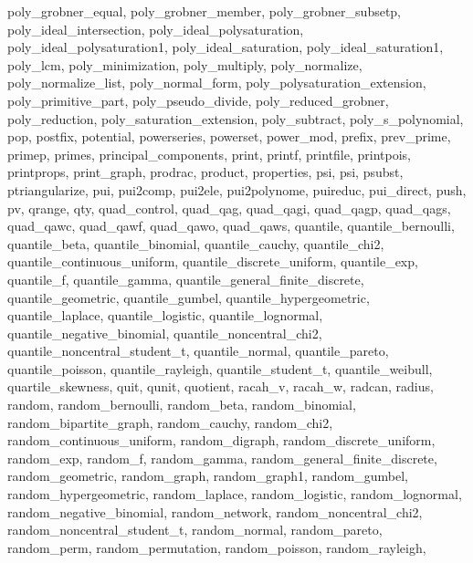 {{    poly_grobner_equal,
    poly_grobner_member,
    poly_grobner_subsetp,
    poly_ideal_intersection,
    poly_ideal_polysaturation,
    poly_ideal_polysaturation1,
    poly_ideal_saturation,
    poly_ideal_saturation1,
    poly_lcm,
    poly_minimization,
    poly_multiply,
    poly_normalize,
    poly_normalize_list,
    poly_normal_form,
    poly_polysaturation_extension,
    poly_primitive_part,
    poly_pseudo_divide,
    poly_reduced_grobner,
    poly_reduction,
    poly_saturation_extension,
    poly_subtract,
    poly_s_polynomial,
    pop,
    postfix,
    potential,
    powerseries,
    powerset,
    power_mod,
    prefix,
    prev_prime,
    primep,
    primes,
    principal_components,
    print,
    printf,
    printfile,
    printpois,
    printprops,
    print_graph,
    prodrac,
    product,
    properties,
    psi,
    psi,
    psubst,
    ptriangularize,
    pui,
    pui2comp,
    pui2ele,
    pui2polynome,
    puireduc,
    pui_direct,
    push,
    pv,
    qrange,
    qty,
    quad_control,
    quad_qag,
    quad_qagi,
    quad_qagp,
    quad_qags,
    quad_qawc,
    quad_qawf,
    quad_qawo,
    quad_qaws,
    quantile,
    quantile_bernoulli,
    quantile_beta,
    quantile_binomial,
    quantile_cauchy,
    quantile_chi2,
    quantile_continuous_uniform,
    quantile_discrete_uniform,
    quantile_exp,
    quantile_f,
    quantile_gamma,
    quantile_general_finite_discrete,
    quantile_geometric,
    quantile_gumbel,
    quantile_hypergeometric,
    quantile_laplace,
    quantile_logistic,
    quantile_lognormal,
    quantile_negative_binomial,
    quantile_noncentral_chi2,
    quantile_noncentral_student_t,
    quantile_normal,
    quantile_pareto,
    quantile_poisson,
    quantile_rayleigh,
    quantile_student_t,
    quantile_weibull,
    quartile_skewness,
    quit,
    qunit,
    quotient,
    racah_v,
    racah_w,
    radcan,
    radius,
    random,
    random_bernoulli,
    random_beta,
    random_binomial,
    random_bipartite_graph,
    random_cauchy,
    random_chi2,
    random_continuous_uniform,
    random_digraph,
    random_discrete_uniform,
    random_exp,
    random_f,
    random_gamma,
    random_general_finite_discrete,
    random_geometric,
    random_graph,
    random_graph1,
    random_gumbel,
    random_hypergeometric,
    random_laplace,
    random_logistic,
    random_lognormal,
    random_negative_binomial,
    random_network,
    random_noncentral_chi2,
    random_noncentral_student_t,
    random_normal,
    random_pareto,
    random_perm,
    random_permutation,
    random_poisson,
    random_rayleigh,
}}
